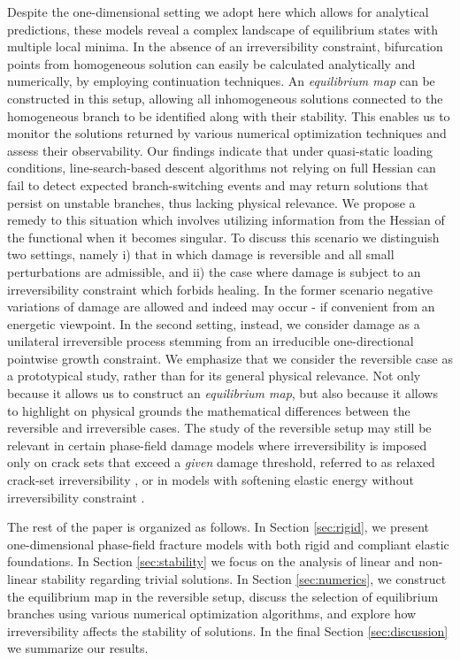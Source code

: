 Despite the one-dimensional setting we adopt here which allows for analytical predictions, these models reveal a complex landscape of equilibrium states with multiple local minima.
In the absence of an irreversibility constraint, bifurcation points from homogeneous solution can easily be calculated analytically and numerically, by employing continuation techniques.
An \emph{equilibrium map} can be constructed in this setup, allowing all  {inhomogeneous} solutions connected to the homogeneous branch to be identified along with their stability.
This enables us to monitor the solutions returned by various numerical optimization techniques and assess their observability.
Our findings indicate that under quasi-static loading conditions, line-search-based descent algorithms not relying on full Hessian can fail to detect expected branch-switching events and may return solutions that persist on unstable branches, thus lacking physical relevance.
We propose a remedy to this situation which involves utilizing information from the Hessian of the functional when it becomes singular.
To discuss this scenario we distinguish two settings, namely i) that in which damage is reversible and all small perturbations are admissible, and ii) the case where damage is subject to an irreversibility constraint which forbids healing. In the former scenario  negative variations of damage are allowed and indeed may occur - if convenient from an energetic viewpoint. In the second setting, instead, we consider damage as a unilateral irreversible process stemming from an irreducible one-directional pointwise growth constraint.
    {We emphasize that we consider the reversible case as a prototypical study, rather than for its general physical relevance. Not only because it allows us to construct an \emph{equilibrium map}, but also because it allows to highlight on physical grounds the mathematical differences  between the reversible and irreversible cases. The study of the reversible setup may still be relevant in certain phase-field damage models where irreversibility is imposed only on crack sets that exceed a \emph{given} damage threshold, referred to as relaxed crack-set irreversibility \cite{Bourdin2000-pc, Kumar2020-xz, De-Lorenzis2020-rz}, or  in models with softening elastic energy without irreversibility constraint \cite{Truskinovsky2010-st,Salman2019-kp,Salman2021-mn,Baggio2023-yo}.}


The rest of the paper is organized as follows. In Section \ref{sec:rigid}, we present one-dimensional phase-field fracture models with both rigid and compliant elastic foundations. In Section \ref{sec:stability} we focus on the analysis  of linear and non-linear stability regarding trivial solutions. In Section \ref{sec:numerics}, we construct the equilibrium map in the reversible setup, discuss the selection of equilibrium branches using various numerical optimization algorithms, and explore how irreversibility affects the stability of solutions. In the final Section \ref{sec:discussion}  we summarize our results.


